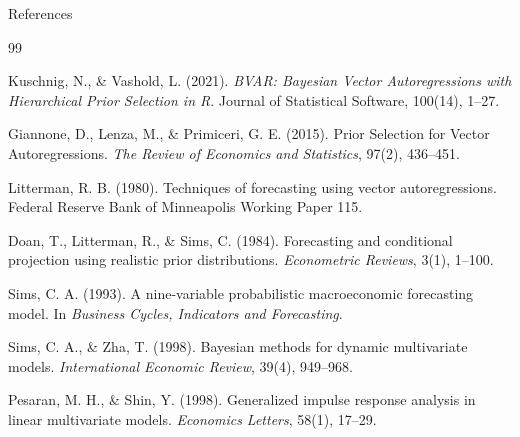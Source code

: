 \documentclass[10pt, aspectratio=169]{beamer}
\begin{document}
\begin{frame}[allowframebreaks]{References}
\scriptsize
\begin{thebibliography}{99}

Kuschnig, N., \& Vashold, L. (2021).
\newblock \emph{BVAR: Bayesian Vector Autoregressions with Hierarchical Prior Selection in R}.
\newblock Journal of Statistical Software, 100(14), 1--27.

Giannone, D., Lenza, M., \& Primiceri, G. E. (2015).
\newblock Prior Selection for Vector Autoregressions.
\newblock \emph{The Review of Economics and Statistics}, 97(2), 436--451.

Litterman, R. B. (1980).
\newblock Techniques of forecasting using vector autoregressions.
\newblock Federal Reserve Bank of Minneapolis Working Paper 115.

Doan, T., Litterman, R., \& Sims, C. (1984).
\newblock Forecasting and conditional projection using realistic prior distributions.
\newblock \emph{Econometric Reviews}, 3(1), 1--100.

Sims, C. A. (1993).
\newblock A nine-variable probabilistic macroeconomic forecasting model.
\newblock In \emph{Business Cycles, Indicators and Forecasting}.

Sims, C. A., \& Zha, T. (1998).
\newblock Bayesian methods for dynamic multivariate models.
\newblock \emph{International Economic Review}, 39(4), 949--968.

Pesaran, M. H., \& Shin, Y. (1998).
\newblock Generalized impulse response analysis in linear multivariate models.
\newblock \emph{Economics Letters}, 58(1), 17--29.

\end{thebibliography}
\end{frame}

\end{document}
